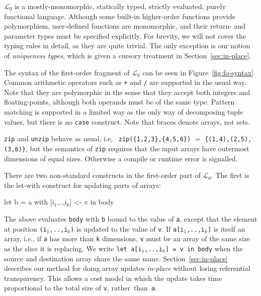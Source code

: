 \documentclass{sigplanconf}  %
\newcommand{\mymath}[1]{$ #1 $}
\newcommand{\myindx}[1]{_{#1}}
\newcommand{\LO}{$\mathcal{L}_0$}
\begin{document}
\LO{} is a mostly-monomorphic, statically typed, strictly evaluated,
purely functional language.  Although some built-in higher-order
functions provide polymorphism, user-defined functions are
monomorphic, and their return- and parameter types must be specified
explicitly.  For brevity, we will not cover the typing
rules in detail, as they are quite trivial.  The only exception is our
notion of {\em uniqueness types}, which is given a cursory treatment
in Section~\ref{sec:in-place}.

The syntax of the first-order fragment of \LO{} can be seen in Figure~\ref{fig:fo-syntax}.  
Common arithmetic operators such as {\tt +} and
{\tt /} are supported in the usual way.  Note that they are
polymorphic in the sense that they accept both integers and
floating-points, although both operands must be of the same type.
Pattern matching is supported in a limited way as the only way of
decomposing tuple values, but there is no {\tt case} construct.  
Note that braces denote arrays, not sets.

{\tt zip} and {\tt unzip} behave as usual, i.e, {\tt
  zip(\{1,2,3\},\{4,5,6\})} $=$ {\tt \{{(1,4),(2,5),(3,6)}\}}, but the
semantics of {\tt zip} requires that the input arrays have outermost
dimensions of equal sizes. Otherwise a compile or runtime error is signalled.

There are two non-standard constructs in the first-order part  %
of \LO{}.  The first is the let-with construct for updating parts of
arrays:

\begin{colorcode}
let b = a with [i\mymath{\myindx{1}},..,i\mymath{\myindx{k}}] <- v in body
\end{colorcode}

The above evaluates {\tt body} with {\tt b} bound to the value of {\tt a}, 
except that the element at position {\tt (i$_1$,..,i$_k$)} is updated to
the value of {\tt v}.  If {\tt a[i$_1$,..,i$_k$]} is itself an array,
i.e., if {\tt a} has more than {\tt k} dimensions, {\tt v} must be 
an array of the same size as the slice it is replacing.  We write 
{\tt let~a[i$_1$,..,i$_k$]~=~v~in~body} when the 
source and destination array share the same name.
%
Section~\ref{sec:in-place} describes our method for doing array updates 
{\em in-place} without losing referential transparency. This allows a 
cost model in which the update takes time proportional to the total 
size of {\tt v}, rather~than~{\tt a}.
\end{document}
